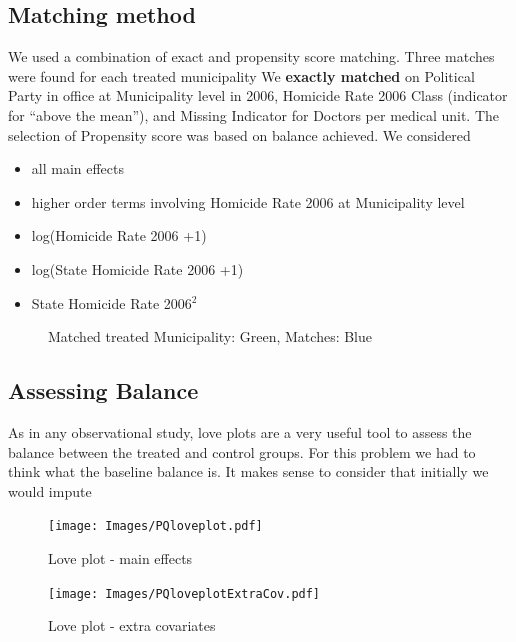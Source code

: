 \documentclass{article}[11 pt]
\begin{document}
\subsection{Matching method}
We used a combination of exact and propensity score matching. Three matches were found for each treated municipality We \textbf{exactly matched} on Political Party in office at Municipality level in 2006, Homicide Rate 2006 Class (indicator for ``above the mean''), and Missing Indicator for Doctors per medical unit. The selection of Propensity score was based on balance achieved. We considered
\begin{itemize}
	 \item all main effects
	\item higher order terms involving Homicide Rate 2006 at Municipality level
	\item log(Homicide Rate 2006 +1)
	\item log(State Homicide Rate 2006 +1)
	\item State Homicide Rate 2006$^2$
\end{itemize}

\begin{figure}[htdp]
    \centering
{}
	\hspace{2cm}
\caption{Matched treated Municipality: Green, Matches: Blue}	
\end{figure}	


\subsection{Assessing Balance}
As in any observational study, love plots are a very useful tool to assess the balance between the treated and control groups. For this problem we had to think what the baseline balance is. It makes sense to consider that initially we would impute $$ $$

\begin{figure}[htdp]
       \texttt{[image: Images/PQloveplot.pdf]}
		\caption{Love plot - main effects}
\end{figure}


\begin{figure}[htdp]
       \texttt{[image: Images/PQloveplotExtraCov.pdf]}
		\caption{Love plot - extra covariates}
\end{figure}
	
\end{document}
